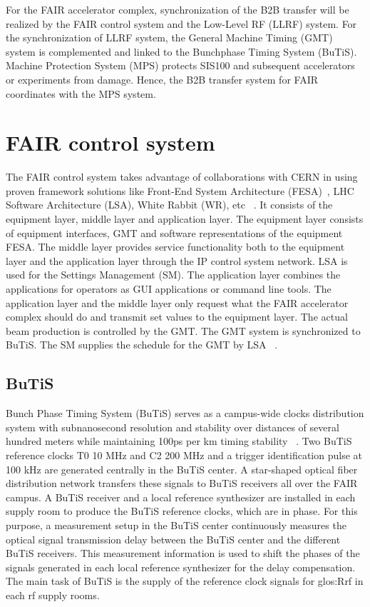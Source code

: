 
For the FAIR accelerator complex, synchronization of the B2B transfer will be realized by the FAIR control system and the Low-Level RF (LLRF) system. For the synchronization of LLRF system, the General Machine Timing (GMT) system is complemented and linked to the Bunchphase Timing System (BuTiS). Machine Protection System (MPS) protects SIS100 and subsequent accelerators or experiments from damage. Hence, the B2B transfer system for FAIR coordinates with the MPS system. 
\section{FAIR control system}
The \gls{FAIR} control system takes advantage of collaborations with CERN in using proven framework solutions like Front-End System Architecture (\gls{FESA})~\cite{hoffmann_fesafront-end_2008}, LHC Software Architecture (\gls{LSA}), White Rabbit (\gls{WR}), etc ~\cite{huhmann_fair_2013}. It consists of the equipment layer, middle layer and application layer. The equipment layer consists of equipment interfaces, GMT and software representations of the equipment FESA. The middle layer provides service functionality both to the equipment layer and the application layer through the IP control system network. LSA is used for the Settings Management (SM). The application layer combines the applications for operators as \gls{GUI} applications or command line tools. The application layer and the middle layer only request what the FAIR accelerator complex should do and transmit set values to the equipment layer. The actual beam production is controlled by the GMT. The GMT system is synchronized to BuTiS. The \gls{SM} supplies the schedule for the GMT by LSA ~\cite{huhmann_fair_2013, beck_new_2012}.

\subsection{BuTiS}
Bunch Phase Timing System (BuTiS) serves as a campus-wide clocks distribution system with subnanosecond resolution and stability over distances of several hundred meters while maintaining 100ps per km timing stability ~\cite{moritz_butisdevelopment_2006}. Two BuTiS reference clocks T0 10 MHz and C2 200 MHz and a trigger identification pulse at 100 kHz are generated centrally in the BuTiS center. A star-shaped optical fiber distribution network transfers these signals to BuTiS receivers all over the FAIR campus. A BuTiS receiver and a local reference synthesizer are installed in each supply room to produce the BuTiS reference clocks, which are in phase. For this purpose, a measurement setup in the BuTiS center continuously measures the optical signal transmission delay between the BuTiS center and the different BuTiS receivers. This measurement information is used to shift the phases of the signals generated in each local reference synthesizer for the delay compensation. The main task of BuTiS is the supply of the reference clock signals for \gls{glos:Rrf} in each rf supply rooms. ~\cite{moritz_butisdevelopment_2006, zipfel_recent_2011}


